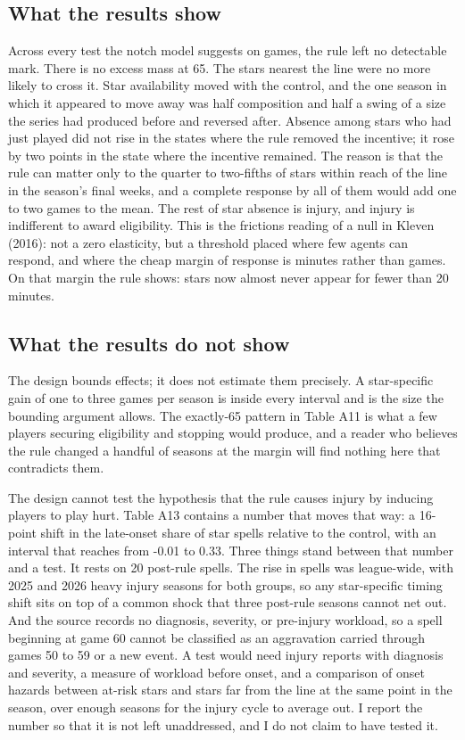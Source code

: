 \documentclass[11pt]{article}
\begin{document}
\subsection*{What the results show}


Across every test the notch model suggests on games, the rule left no detectable mark. There is no excess mass at 65. The stars nearest the line were no more likely to cross it. Star availability moved with the control, and the one season in which it appeared to move away was half composition and half a swing of a size the series had produced before and reversed after. Absence among stars who had just played did not rise in the states where the rule removed the incentive; it rose by two points in the state where the incentive remained. The reason is that the rule can matter only to the quarter to two-fifths of stars within reach of the line in the season's final weeks, and a complete response by all of them would add one to two games to the mean. The rest of star absence is injury, and injury is indifferent to award eligibility. This is the frictions reading of a null in Kleven (2016): not a zero elasticity, but a threshold placed where few agents can respond, and where the cheap margin of response is minutes rather than games. On that margin the rule shows: stars now almost never appear for fewer than 20 minutes.


\subsection*{What the results do not show}


The design bounds effects; it does not estimate them precisely. A star-specific gain of one to three games per season is inside every interval and is the size the bounding argument allows. The exactly-65 pattern in Table A11 is what a few players securing eligibility and stopping would produce, and a reader who believes the rule changed a handful of seasons at the margin will find nothing here that contradicts them.

The design cannot test the hypothesis that the rule causes injury by inducing players to play hurt. Table A13 contains a number that moves that way: a 16-point shift in the late-onset share of star spells relative to the control, with an interval that reaches from -0.01 to 0.33. Three things stand between that number and a test. It rests on 20 post-rule spells. The rise in spells was league-wide, with 2025 and 2026 heavy injury seasons for both groups, so any star-specific timing shift sits on top of a common shock that three post-rule seasons cannot net out. And the source records no diagnosis, severity, or pre-injury workload, so a spell beginning at game 60 cannot be classified as an aggravation carried through games 50 to 59 or a new event. A test would need injury reports with diagnosis and severity, a measure of workload before onset, and a comparison of onset hazards between at-risk stars and stars far from the line at the same point in the season, over enough seasons for the injury cycle to average out. I report the number so that it is not left unaddressed, and I do not claim to have tested it.
\end{document}
